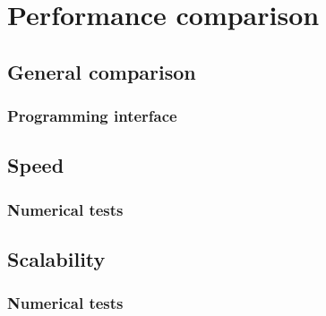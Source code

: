 
\section{Performance comparison}\label{sec:numer}

\subsection{General comparison}

\begin{frame}
  \MyLogo
  \frametitle{Programming interface}  

\end{frame}

\subsection{Speed}

\begin{frame}
  \MyLogo
  \frametitle{Numerical tests}  

\end{frame}

\subsection{Scalability}

\begin{frame}
  \MyLogo
  \frametitle{Numerical tests}  

\end{frame}